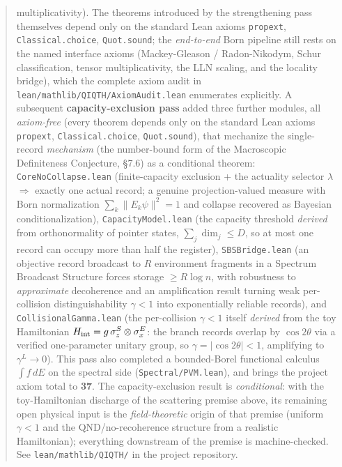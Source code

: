 \documentclass[11pt,a4paper]{article}
\begin{document}
\begin{abstract}
multiplicativity). The theorems introduced by the strengthening pass themselves depend only on the standard Lean axioms \texttt{propext}, \texttt{Classical.choice}, \texttt{Quot.sound}; the \emph{end-to-end} Born pipeline still rests on the named interface axioms (Mackey-Gleason / Radon-Nikodym, Schur classification, tensor multiplicativity, the LLN scaling, and the locality bridge), which the complete axiom audit in \texttt{lean/mathlib/QIQTH/AxiomAudit.lean} enumerates explicitly. A subsequent \textbf{capacity-exclusion pass} added three further modules, all \emph{axiom-free} (every theorem depends only on the standard Lean axioms \texttt{propext}, \texttt{Classical.choice}, \texttt{Quot.sound}), that mechanize the single-record \emph{mechanism} (the number-bound form of the Macroscopic Definiteness Conjecture, §7.6) as a conditional theorem: \texttt{CoreNoCollapse.lean} (finite-capacity exclusion + the actuality selector $\lambda$ $\Rightarrow$ exactly one actual record; a genuine projection-valued measure with Born normalization $\sum_k\|E_k\psi\|^2=1$ and collapse recovered as Bayesian conditionalization), \texttt{CapacityModel.lean} (the capacity threshold \emph{derived} from orthonormality of pointer states, $\sum_j \dim_j \le D$, so at most one record can occupy more than half the register), \texttt{SBSBridge.lean} (an objective record broadcast to $R$ environment fragments in a Spectrum Broadcast Structure forces storage $\ge R\log n$, with robustness to \emph{approximate} decoherence and an amplification result turning weak per-collision distinguishability $\gamma<1$ into exponentially reliable records), and \texttt{CollisionalGamma.lean} (the per-collision $\gamma<1$ itself \emph{derived} from the toy Hamiltonian $H_{\rm int}=g\,\sigma_z^S\otimes\sigma_x^E$: the branch records overlap by $\cos 2\theta$ via a verified one-parameter unitary group, so $\gamma=|\cos2\theta|<1$, amplifying to $\gamma^L\to0$). This pass also completed a bounded-Borel functional calculus $\int f\,dE$ on the spectral side (\texttt{Spectral/PVM.lean}), and brings the project axiom total to \textbf{37}. The capacity-exclusion result is \emph{conditional}: with the toy-Hamiltonian discharge of the scattering premise above, its remaining open physical input is the \emph{field-theoretic} origin of that premise (uniform $\gamma<1$ and the QND/no-recoherence structure from a realistic Hamiltonian); everything downstream of the premise is machine-checked. See \texttt{lean/mathlib/QIQTH/} in the project repository.
\end{abstract}
\end{document}
